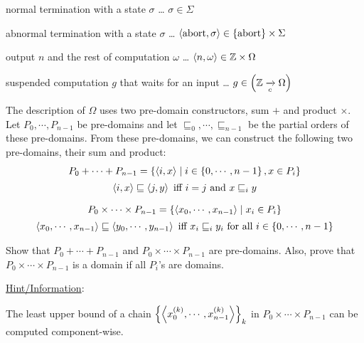 \begin{enumcirc}
\begin{enumrm}
		\item
		normal termination with a state $\sigma$ \dots
		$\sigma \in \Sigma$
		\item
		abnormal termination with a state $\sigma$ \dots
		$\left\langle \textrm{abort}, \sigma \right\rangle \in \left\{ \textrm{abort} \right\} \times \Sigma$
		\item
		output $n$ and the rest of computation $\omega$ \dots
		$\left\langle n, \omega \right\rangle \in \mathbb{Z} \times \Omega$
		\item
		suspended computation $g$ that waits for an input \dots
		$g \in \left( \mathbb{Z} \xrightarrow[c]{} \Omega \right)$
	\end{enumrm}
	\item
	The description of $\Omega$ uses two pre-domain constructors, sum $+$ and
	product $\times$.
	Let $P_0, \cdots, P_{n-1}$ be pre-domains and let
	$\sqsubseteq_0, \cdots, \sqsubseteq_{n-1}$ be the partial orders of these pre-domains.
	From these pre-domains, we can construct the following two pre-domains, their
	sum and product:
	\[
		\begin{array}{c}
			P_0 + \cdots + P_{n-1} = \left\{ \left\langle i, x \right\rangle \; \middle\vert \; i \in \left\{ 0, \cdots, n-1 \right\}, x \in P_i \right\}          \\[0.5em]
			\left\langle i, x \right\rangle \sqsubseteq \left\langle j, y \right\rangle \textrm{ iff } i = j \textrm{ and } x \sqsubseteq_i y \\[1em]
			P_0 \times \cdots \times P_{n-1} = \left\{ \left\langle x_0, \cdots, x_{n-1} \right\rangle \; \middle\vert \; x_i \in P_i \right\}             \\[0.5em]
			\left\langle x_0, \cdots, x_{n-1} \right\rangle \sqsubseteq \left\langle y_0, \cdots, y_{n-1} \right\rangle \textrm{ iff }
			x_i \sqsubseteq_i y_i \textrm{ for all } i \in \left\{ 0, \cdots, n-1 \right\}
		\end{array}
	\]
	\begin{enumrm}
		\item
		\begin{exercise}
			Show that $P_0 + \cdots + P_{n-1}$ and $P_0 \times \cdots \times P_{n-1}$ are
			pre-domains.
			Also, prove that $P_0 \times \cdots \times P_{n-1}$ is a domain if all $P_i$'s
			are domains.
		\end{exercise}
		\underline{Hint/Information}:
		\begin{enumalpha}
			\item
			The least upper bound of a chain
			$\left\{ \left\langle x_0^{(k)}, \cdots, x_{n-1}^{(k)} \right\rangle \right\}_k$ in
			$P_0 \times \cdots \times P_{n-1}$ can be computed component-wise.
			\[
\]
\end{enumalpha}
\end{enumrm}
\end{enumcirc}

